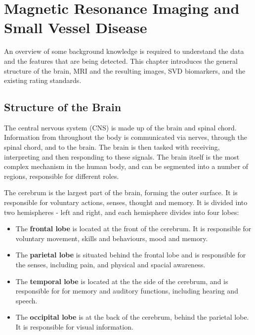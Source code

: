 \documentclass[honours,12pt]{unswthesis}
\numberwithin{equation}{section}
\begin{document}
\chapter{Magnetic Resonance Imaging and Small Vessel Disease}\label{mri_svd_intro}

An overview of some background knowledge is required to understand the data and the features that are being detected. This chapter introduces the general structure of the brain, MRI and the resulting images, SVD biomarkers, and the existing rating standards.

\section{Structure of the Brain}\label{brain}

The central nervous system (CNS) is made up of the brain and spinal chord. Information from throughout the body is communicated via nerves, through the spinal chord, and to the brain. The brain is then tasked with receiving, interpreting and then responding to these signals. The brain itself is the most complex mechanism in the human body, and can be segmented into a number of regions, responsible for different roles. 

The cerebrum is the largest part of the brain, forming the outer surface. It is responsible for voluntary actions, senses, thought and memory. It is divided into two hemispheres - left and right, and each hemisphere divides into four lobes: \begin{itemize}
	\item The \textbf{frontal lobe} is located at the front of the cerebrum. It is responsible for voluntary movement, skills and behaviours, mood and memory.
	\item The \textbf{parietal lobe} is situated behind the frontal lobe and is responsible for the senses, including pain, and physical and spacial awareness.
	\item The \textbf{temporal lobe} is located at the the side of the cerebrum, and is responsible for for memory and auditory functions, including hearing and speech.
	\item The \textbf{occipital lobe} is at the back of the cerebrum, behind the parietal lobe. It is responsible for visual information.
\end{itemize}
\end{document}
